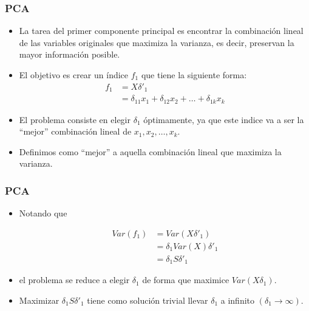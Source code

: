 \documentclass[
  shownotes,
  xcolor={svgnames},
  hyperref={colorlinks,citecolor=DarkBlue,linkcolor=DarkRed,urlcolor=DarkBlue}
  , aspectratio=169]{beamer}
\begin{document}
\begin{frame}
\frametitle{PCA}
\begin{itemize}

  \item La tarea del primer componente principal es encontrar la combinación lineal de las variables originales que maximiza la varianza, es decir, preservan la mayor información posible. 
  \item El objetivo es crear un índice \(f_1\) que tiene la siguiente forma:
  \medskip
  \begin{align}
  f_1 &= X \delta'_1 \\
      &= \delta_{11} x_1+ \delta_{12} x_2 + \dots + \delta_{1k} x_k
  \end{align}

  \item  El problema consiste en elegir \(\delta_1\) óptimamente, ya que este indice va a ser la ``mejor'' combinación lineal de \(x_1, x_2, \dots, x_k\). 
  \medskip
  \item Definimos como ``mejor'' a aquella combinación lineal que maximiza la varianza. 
\end{itemize}
\end{frame}
\begin{frame}
\frametitle{PCA}

\begin{itemize}

  \item Notando que

\begin{align}
Var(f_1) &= Var(X \delta'_1) \\
       &= \delta_1 Var(X ) \delta'_1 \\
       &= \delta_1 S \delta'_1 
\end{align}

\item el problema se reduce a elegir \(\delta_1\) de forma que maximice \(Var(X \delta_1)\). 
\pause
\item Maximizar \(\delta_1 S \delta'_1\) tiene como solución trivial llevar \(\delta_1\) a infinito \((\delta_1 \rightarrow \infty)\).
\end{itemize}

\end{frame}
\end{document}
